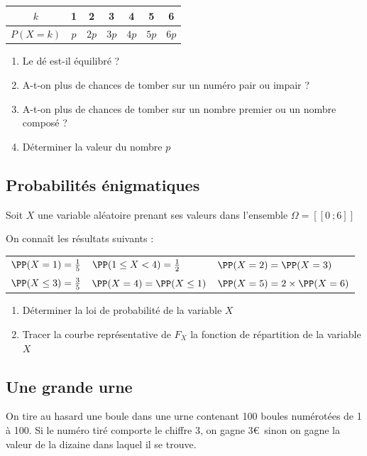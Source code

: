 \documentclass[oneside,12pt]{book}          %
\begin{document}
\begin{center}
\renewcommand{\arraystretch}{1.5}
\setlength{\tabcolsep}{15pt}
\begin{tabular}{|c|c|c|c|c|c|c|} \hline
    $k$ & 1 & 2 & 3 & 4 & 5 & 6 \\ \hline
    $P(X=k)$ & $p$ & $2p$ & $3p$ & $4p$ & $5p$ & $6p$ \\ \hline
\end{tabular}
\end{center}
\begin{enumerate}
    \item Le dé est-il équilibré ?
    \item A-t-on plus de chances de tomber sur un numéro pair ou impair ?
    \item A-t-on plus de chances de tomber sur un nombre premier ou un nombre composé ?
    \item Déterminer la valeur du nombre $p$
\end{enumerate}


\subsection{Probabilités énigmatiques}
Soit $X$ une variable aléatoire prenant ses valeurs dans l'ensemble $\Omega=[\![0~;6]\!]$

On connaît les résultats suivants : 

\begin{tabular}{p{5cm}p{5cm}p{5cm}}
    $\PP(X=1)=\frac{1}{5}$ & $\PP(1\leq X<4)=\frac{1}{2}$ & $\PP(X=2)=\PP(X=3)$ \\[5pt]
    $\PP(X\leq3)=\frac{3}{5}$ & $\PP(X=4)=\PP(X\leq1)$ & $\PP(X=5)=2\times\PP(X=6)$
\end{tabular}
\begin{enumerate}
	\item Déterminer la loi de probabilité de la variable $X$
	\item Tracer la courbe représentative de $F_X$ la fonction de répartition de la variable $X$
\end{enumerate}



\subsection{Une grande urne}
On tire au hasard une boule dans une urne contenant 100 boules numérotées de 1 à 100. Si le numéro tiré comporte le chiffre 3, on gagne 3\euro\, sinon on gagne la valeur de la dizaine dans laquel il se trouve.
\end{document}
